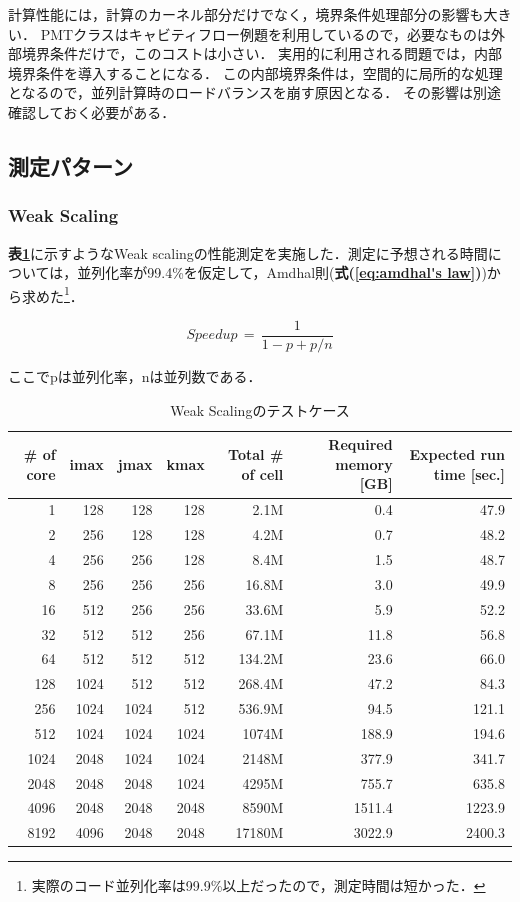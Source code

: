 計算性能には，計算のカーネル部分だけでなく，境界条件処理部分の影響も大きい．
PMTクラスはキャビティフロー例題を利用しているので，必要なものは外部境界条件だけで，このコストは小さい．
実用的に利用される問題では，内部境界条件を導入することになる．
この内部境界条件は，空間的に局所的な処理となるので，並列計算時のロードバランスを崩す原因となる．
その影響は別途確認しておく必要がある．

\subsection{測定パターン}
%
\subsubsection{Weak Scaling}
\textbf{表\ref{tbl:weak scaling plan}}に示すようなWeak scalingの性能測定を実施した．測定に予想される時間については，並列化率が99.4\%を仮定して，Amdhal則(\textbf{式(\ref{eq:amdhal's law})})から求めた\footnote{実際のコード並列化率は99.9\%以上だったので，測定時間は短かった．}．

\begin{equation}
\displaystyle { Speedup \, =\, \frac{1}{1-p+p/n} }
\label{eq:amdhal's law}
\end{equation}

\noindent ここでpは並列化率，nは並列数である．

\begin{table}[htdp]
\caption{Weak Scalingのテストケース}
\small
\begin{center}
\begin{tabular}{rrrrrrr}\toprule
\# of core & imax & jmax & kmax & Total \# of cell & Required memory [GB] & Expected run time [sec.]\\ \midrule
1    &  128 &  128 &  128 &   2.1M &    0.4 &   47.9\\
2    &  256 &  128 &  128 &   4.2M &    0.7 &   48.2\\
4    &  256 &  256 &  128 &   8.4M &    1.5 &   48.7\\
8    &  256 &  256 &  256 &  16.8M &    3.0 &   49.9\\
16   &  512 &  256 &  256 &  33.6M &    5.9 &   52.2\\
32   &  512 &  512 &  256 &  67.1M &   11.8 &   56.8\\
64   &  512 &  512 &  512 & 134.2M &   23.6 &   66.0\\
128  & 1024 &  512 &  512 & 268.4M &   47.2 &   84.3\\
256  & 1024 & 1024 &  512 & 536.9M &   94.5 &  121.1\\
512  & 1024 & 1024 & 1024 &  1074M &  188.9 &  194.6\\
1024 & 2048 & 1024 & 1024 &  2148M &  377.9 &  341.7\\
2048 & 2048 & 2048 & 1024 &  4295M &  755.7 &  635.8\\
4096 & 2048 & 2048 & 2048 &  8590M & 1511.4 & 1223.9\\
8192 & 4096 & 2048 & 2048 & 17180M & 3022.9 & 2400.3\\ \bottomrule
\end{tabular}
\end{center}
\label{tbl:weak scaling plan}
\end{table}

